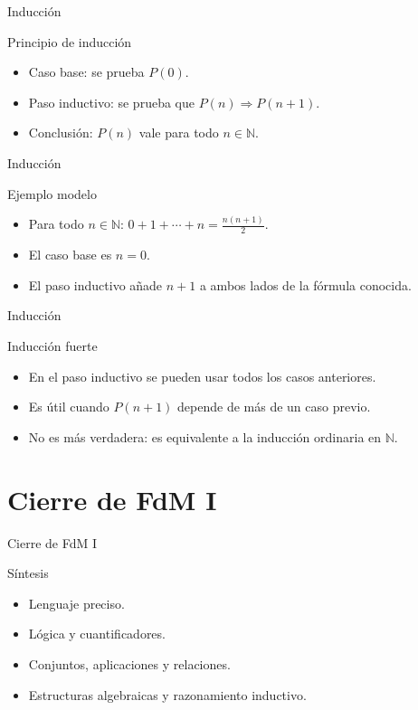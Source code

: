 \documentclass[aspectratio=169,11pt]{beamer}
\begin{document}
\begin{frame}{Inducción}
\begin{block}{Principio de inducción}
\begin{itemize}
  \item Caso base: se prueba \(P(0)\).
  \item Paso inductivo: se prueba que \(P(n)\Rightarrow P(n+1)\).
  \item Conclusión: \(P(n)\) vale para todo \(n\in\mathbb{N}\).
\end{itemize}
\end{block}
\end{frame}

\begin{frame}{Inducción}
\begin{block}{Ejemplo modelo}
\begin{itemize}
  \item Para todo \(n\in\mathbb{N}\): \(0+1+\cdots+n=\frac{n(n+1)}{2}\).
  \item El caso base es \(n=0\).
  \item El paso inductivo añade \(n+1\) a ambos lados de la fórmula conocida.
\end{itemize}
\end{block}
\end{frame}

\begin{frame}{Inducción}
\begin{block}{Inducción fuerte}
\begin{itemize}
  \item En el paso inductivo se pueden usar todos los casos anteriores.
  \item Es útil cuando \(P(n+1)\) depende de más de un caso previo.
  \item No es más verdadera: es equivalente a la inducción ordinaria en \(\mathbb{N}\).
\end{itemize}
\end{block}
\end{frame}

\section{Cierre de FdM I}

\begin{frame}{Cierre de FdM I}
\begin{block}{Síntesis}
\begin{itemize}
  \item Lenguaje preciso.
  \item Lógica y cuantificadores.
  \item Conjuntos, aplicaciones y relaciones.
  \item Estructuras algebraicas y razonamiento inductivo.
\end{itemize}
\end{block}
\end{frame}
\end{document}
